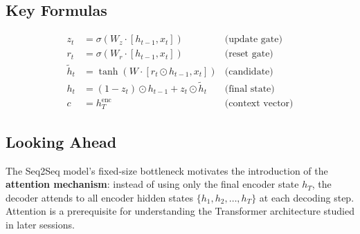 \documentclass[12pt,a4paper]{article}
\begin{document}
\subsection{Key Formulas}

\begin{align*}
  z_t &= \sigma(W_z\cdot[h_{t-1},x_t]) & \text{(update gate)}\\
  r_t &= \sigma(W_r\cdot[h_{t-1},x_t]) & \text{(reset gate)}\\
  \tilde{h}_t &= \tanh(W\cdot[r_t\odot h_{t-1},x_t]) & \text{(candidate)}\\
  h_t &= (1-z_t)\odot h_{t-1} + z_t\odot\tilde{h}_t & \text{(final state)}\\
  c &= h_T^{\text{enc}} & \text{(context vector)}
\end{align*}

\subsection{Looking Ahead}

The Seq2Seq model's fixed-size bottleneck motivates the introduction of the
\textbf{attention mechanism}: instead of using only the final encoder state $h_T$, the decoder
attends to all encoder hidden states $\{h_1, h_2, \ldots, h_T\}$ at each decoding step.
Attention is a prerequisite for understanding the Transformer architecture studied in later sessions.
\end{document}
